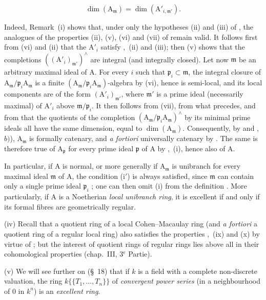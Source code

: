 \begin{remarks}[7.8.4]
\begin{env}[7.8.4.1]
\label{IV.7.8.4.1}
\[
  \dim(\mathrm{A}_\mathfrak{m})=\dim(\mathrm{A}'_{i,\mathfrak{m}'}).
\]
\end{env}

Indeed, Remark~(i) shows that, under only the hypotheses (ii) and (iii) of , the analogues of the properties (ii), (v), (vi) and (vii) of  remain valid. It follows first from (vi) and (ii) that the $\mathrm{A}'_i$ satisfy ,~(ii) and (iii); then (v) shows that the completions $((\mathrm{A}'_i)_{\mathfrak{m}'})^\wedge$ are integral (and integrally closed). Let now $\mathfrak{m}$ be an arbitrary maximal ideal of $\mathrm{A}$. For every $i$ such that $\mathfrak{p}_i\subset\mathfrak{m}$, the integral closure of $\mathrm{A}_\mathfrak{m}/\mathfrak{p}_i\mathrm{A}_\mathfrak{m}$ is a finite $(\mathrm{A}_\mathfrak{m}/\mathfrak{p}_i\mathrm{A}_\mathfrak{m})$-algebra by (vi), hence is semi-local, and its local components are of the form $(\mathrm{A}'_i)_{\mathfrak{m}'}$, where $\mathfrak{m}'$ is a prime ideal (necessarily maximal) of $\mathrm{A}'_i$ above $\mathfrak{m}/\mathfrak{p}_i$. It then follows from (vii), from what precedes, and from  that the quotients of the completion $(\mathrm{A}_\mathfrak{m}/\mathfrak{p}_i\mathrm{A}_\mathfrak{m})^\wedge$ by its minimal prime ideals all have the same dimension, equal to $\dim(\mathrm{A}_\mathfrak{m})$. Consequently, by  and ,~$b)$), $\mathrm{A}_\mathfrak{m}$ is formally catenary, and \emph{a fortiori} universally catenary by . The same is therefore true of $\mathrm{A}_\mathfrak{p}$ for every prime ideal $\mathfrak{p}$ of $\mathrm{A}$ by ,~(i), hence also of $\mathrm{A}$.

In particular, if $\mathrm{A}$ is normal, or more generally if $\mathrm{A}_\mathfrak{m}$ is unibranch for every maximal ideal $\mathfrak{m}$ of $\mathrm{A}$, the condition (i$'$) is always satisfied, since $\mathfrak{m}$ can contain only a single prime ideal $\mathfrak{p}_i$ ; one can then omit (i) from the definition . More particularly, if $\mathrm{A}$ is a Noetherian \emph{local unibranch ring}, it is excellent if and only if its formal fibres are geometrically regular.

(iv) Recall that a quotient ring of a local Cohen--Macaulay ring (and \emph{a fortiori} a quotient ring of a regular local ring) also satisfies the properties ,~(ix) and (x) by virtue of ; but the interest of quotient rings of regular rings lies above all in their cohomological properties (chap.~III, 3${}^{\text{e}}$ Partie).

(v) We will see further on (\S~18) that if $k$ is a field with a complete non-discrete valuation, the ring $k\{\!\{T_1,\ldots,T_n\}\!\}$ of \emph{convergent power series} (in a neighbourhood of $0$ in $k^n$) is an \emph{excellent ring}.
\end{remarks}

